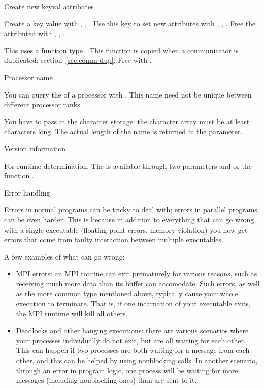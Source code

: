  {Create new keyval attributes}

Create a key value with ,
,
.
%
Use this key to set new attributes with
,
,
.
%
Free the attributed with
,
,
.

This uses a function type .
This function is copied when a communicator is duplicated; section~\ref{sec:comm-dup}.
Free with .

 {Processor name}

You can query the  of a processor with
.
This name need not be unique between different processor ranks.

You have to pass in the character storage:
the character array must be at least  characters long.
The actual length of the name is returned in the  parameter.

 {Version information}

For runtime determination,
The  is available through two parameters
 and 
or the function .

 {Error handling}
\label{sec:mpi:error}

Errors in normal programs can be tricky to deal with; errors in
parallel programs can be even harder. This is because in addition to
everything that can go wrong with a single executable (floating point
errors, memory violation) you now get errors that come from faulty
interaction between multiple executables.

A few examples of what can go wrong:
\begin{itemize}
\item MPI errors: an MPI routine can exit prematurely for various reasons, such
  as receiving much more data than its buffer can accomodate. Such
  errors, as well as the more common type mentioned above, typically
  cause your whole execution to terminate. That is, if one incarnation of
  your executable exits, the MPI runtime will kill all others.
\item Deadlocks and other hanging executions: there are various
  scenarios where your processes individually do not exit, but are all
  waiting for each other. This can happen if two processes are both
  waiting for a message from each other, and this can be helped by
  using nonblocking calls. In another scenario, through an error in
  program logic, one process will be waiting for more messages
  (including nonblocking ones) than are sent to it.
\end{itemize}

